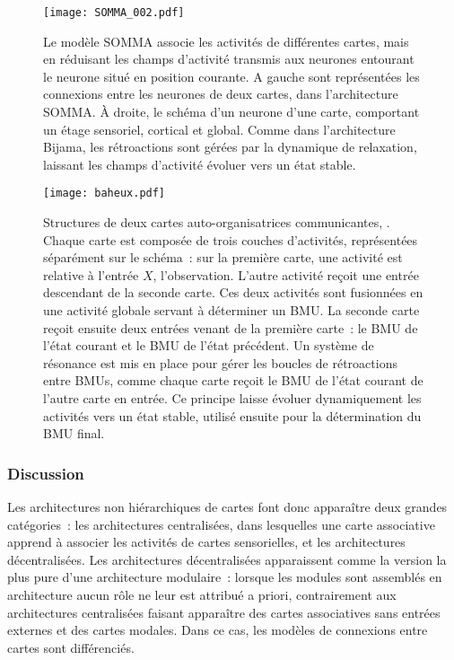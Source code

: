 \documentclass[../main]{subfiles}
\begin{document}
\begin{figure}
    \centering\texttt{[image: SOMMA\_002.pdf]}
    \caption{
        Le modèle SOMMA \cite{lefort_unlearning_2011,lefort_apprentissage_2012} associe les activités de différentes cartes, mais en réduisant les champs d'activité transmis aux neurones entourant le neurone situé en position courante. A gauche sont représentées les connexions entre les neurones de deux cartes, dans l'architecture SOMMA. \`A droite, le schéma d'un neurone d'une carte, comportant un étage sensoriel, cortical et global.
        Comme dans l'architecture Bijama, les rétroactions sont gérées par la dynamique de relaxation, laissant les champs d'activité évoluer vers un état stable.
    \label{fig:somma}}
\end{figure}


\begin{figure}
    \centering
    \texttt{[image: baheux.pdf]}
    \caption{Structures de deux cartes auto-organisatrices communicantes, \cite{baheux_towards_2014}. Chaque carte est composée de trois couches d'activités, représentées séparément sur le schéma~: sur la première carte, une activité est relative à l'entrée $X$, l'observation. L'autre activité reçoit une entrée descendant de la seconde carte. Ces deux activités sont fusionnées en une activité globale servant à déterminer un BMU. La seconde carte reçoit ensuite deux entrées venant de la première carte~: le BMU de l'état courant et le BMU de l'état précédent. Un système de résonance est mis en place pour gérer les boucles de rétroactions entre BMUs, comme chaque carte reçoit le BMU de l'état courant de l'autre carte en entrée. Ce principe laisse évoluer dynamiquement les activités vers un état stable, utilisé ensuite pour la détermination du BMU final.\label{fig:baheux}}
\end{figure}


\subsubsection{Discussion}

Les architectures non hiérarchiques de cartes font donc apparaître deux grandes catégories~: les architectures centralisées, dans lesquelles une carte associative apprend à associer les activités de cartes sensorielles, et les architectures décentralisées.
Les architectures décentralisées apparaissent comme la version la plus pure d'une architecture modulaire~: lorsque les modules sont assemblés en architecture aucun rôle ne leur est attribué a priori, contrairement aux architectures centralisées faisant apparaître des cartes associatives sans entrées externes et des cartes modales. Dans ce cas, les modèles de connexions entre cartes sont différenciés.
\end{document}
